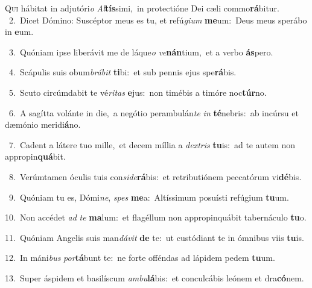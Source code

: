 \lettrine{\initial\textcolor{\initialcolor}{Q}}{ui} hábitat in adjutóri\textit{o} \textit{Al}\-\textbf{tís}simi,~\star in protectióne Dei cæli commo\-\textbf{rá}\-bitur.\\
{\numbfont\textcolor{\numbcolor}{~2.}}~Dicet Dómino: Suscéptor meus es tu, et refú\-\textit{gi}\-\textit{um} \textbf{me}\-um:~\star Deus meus sperábo in \textbf{e}\-um.\par
{\numbfont\textcolor{\numbcolor}{~3.}}~Quóniam ipse liberávit me de láque\textit{o} \textit{ve}\-\textbf{nán}tium,~\star et a verbo \textbf{ás}\-pero.\par
{\numbfont\textcolor{\numbcolor}{~4.}}~Scápulis suis obum\-\textit{brá}\-\textit{bit} \textbf{ti}\-bi:~\star et sub pennis ejus spe\-\textbf{rá}\-bis.\par
{\numbfont\textcolor{\numbcolor}{~5.}}~Scuto circúmdabit te vé\-\textit{ri}\-\textit{tas} \textbf{e}\-jus:~\star non timébis a timóre noc\-\textbf{túr}\-no.\par
{\numbfont\textcolor{\numbcolor}{~6.}}~A sagítta volánte in die,~\dagger a negótio perambulán\textit{te} \textit{in} \textbf{té}\-nebris:~\star ab incúrsu et dæmónio meridi\-\textbf{á}\-no.\par
{\numbfont\textcolor{\numbcolor}{~7.}}~Cadent a látere tuo mille,~\dagger et decem míllia a \textit{dex}\-\textit{tris} \textbf{tu}\-is:~\star ad te autem non appropin\-\textbf{quá}\-bit.\par
{\numbfont\textcolor{\numbcolor}{~8.}}~Verúmtamen óculis tuis con\-\textit{si}\-\textit{de}\textbf{rá}bis:~\star et retributiónem peccatórum vi\-\textbf{dé}\-bis.\par
{\numbfont\textcolor{\numbcolor}{~9.}}~Quóniam tu es, Dómi\-\textit{ne}\-, \textit{spes} \textbf{me}\-a:~\star Altíssimum posuísti refúgium \textbf{tu}\-um.\par
{\numbfont\textcolor{\numbcolor}{10.}}~Non accédet \textit{ad} \textit{te} \textbf{ma}\-lum:~\star et flagéllum non appropinquábit tabernáculo \textbf{tu}\-o.\par
{\numbfont\textcolor{\numbcolor}{11.}}~Quóniam Angelis suis man\-\textit{dá}\-\textit{vit} \textbf{de} te:~\star ut custódiant te in ómnibus viis \textbf{tu}\-is.\par
{\numbfont\textcolor{\numbcolor}{12.}}~In máni\textit{bus} \textit{por}\-\textbf{tá}bunt te:~\star ne forte offéndas ad lápidem pedem \textbf{tu}\-um.\par
{\numbfont\textcolor{\numbcolor}{13.}}~Super áspidem et basilíscum \textit{am}\-\textit{bu}\textbf{lá}bis:~\star et conculcábis leónem et dra\-\textbf{có}\-nem.\par
